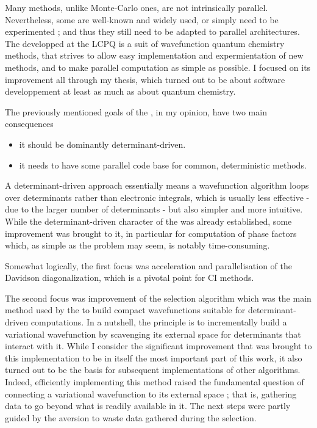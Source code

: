 \documentclass[12pt,a4paper]{report}
\begin{document}
Many methods, unlike Monte-Carlo ones, are not intrinsically parallel. Nevertheless, some are well-known and widely used, or simply need to be experimented ; and thus they still need to be adapted to parallel architectures. The \QP developped at the LCPQ is a suit of wavefunction quantum chemistry methods, that strives to allow easy implementation and expermientation of new methods, and to make parallel computation as simple as possible. I focused on its improvement all through my thesis, which turned out to be about software developpement at least as much as about quantum chemistry.

The previously mentioned goals of the \QP, in my opinion, have two main consequences
\begin{itemize}
\item
it should be dominantly determinant-driven.
\item
it needs to have some parallel code base for common, deterministic methods.
\end{itemize}


A determinant-driven approach essentially means a wavefunction algorithm loops over determinants rather than electronic integrals, which is usually less effective - due to the larger number of determinants - but also simpler and more intuitive. While the determinant-driven character of the \QP was already established, some improvement was brought to it, in particular for computation of phase factors which, as simple as the problem may seem, is notably time-consuming.

Somewhat logically, the first focus was acceleration and parallelisation of the Davidson diagonalization, which is a pivotal point for CI methods.

The second focus was improvement of the selection algorithm which was the main method used by the \QP to build compact wavefunctions suitable for determinant-driven computations. In a nutshell, the principle is to incrementally build a variational wavefunction by scavenging its external space for determinants that interact with it. While I consider the significant improvement that was brought to this implementation to be in itself the most important part of this work, it also turned out to be the basis for subsequent implementations of other algorithms. Indeed, efficiently implementing this method raised the fundamental question of connecting a variational wavefunction to its external space ; that is, gathering data to go beyond what is readily available in it. The next steps were partly guided by the aversion to waste data gathered during the selection.
\end{document}

